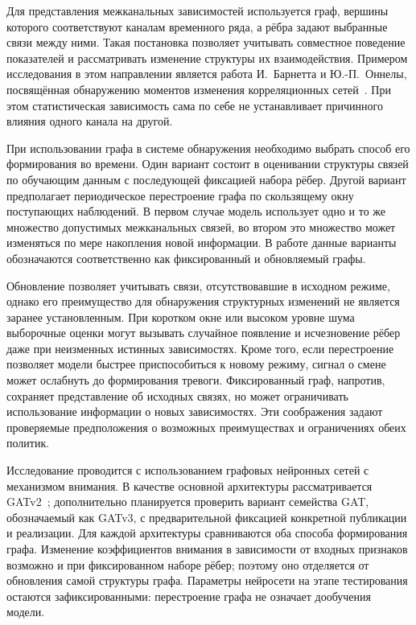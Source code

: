 \documentclass[bachelor, och, diploma]{SCWorks}
\begin{document}
Для представления межканальных зависимостей используется граф, вершины которого соответствуют каналам временного ряда, а рёбра задают выбранные связи между ними. Такая постановка позволяет учитывать совместное поведение показателей и рассматривать изменение структуры их взаимодействия. Примером исследования в этом направлении является работа И.~Барнетта и \mbox{Ю.-П.~Оннелы}, посвящённая обнаружению моментов изменения корреляционных сетей~\cite{barnett2016correlation}. При этом статистическая зависимость сама по себе не устанавливает причинного влияния одного канала на другой.

При использовании графа в системе обнаружения необходимо выбрать способ его формирования во времени. Один вариант состоит в оценивании структуры связей по обучающим данным с последующей фиксацией набора рёбер. Другой вариант предполагает периодическое перестроение графа по скользящему окну поступающих наблюдений. В первом случае модель использует одно и то же множество допустимых межканальных связей, во втором это множество может изменяться по мере накопления новой информации. В работе данные варианты обозначаются соответственно как фиксированный и обновляемый графы.

Обновление позволяет учитывать связи, отсутствовавшие в исходном режиме, однако его преимущество для обнаружения структурных изменений не является заранее установленным. При коротком окне или высоком уровне шума выборочные оценки могут вызывать случайное появление и исчезновение рёбер даже при неизменных истинных зависимостях. Кроме того, если перестроение позволяет модели быстрее приспособиться к новому режиму, сигнал о смене может ослабнуть до формирования тревоги. Фиксированный граф, напротив, сохраняет представление об исходных связях, но может ограничивать использование информации о новых зависимостях. Эти соображения задают проверяемые предположения о возможных преимуществах и ограничениях обеих политик.

Исследование проводится с использованием графовых нейронных сетей с механизмом внимания. В качестве основной архитектуры рассматривается GATv2~\cite{brody2022attentive}; дополнительно планируется проверить вариант семейства GAT, обозначаемый как GATv3, с предварительной фиксацией конкретной публикации и реализации. Для каждой архитектуры сравниваются оба способа формирования графа. Изменение коэффициентов внимания в зависимости от входных признаков возможно и при фиксированном наборе рёбер; поэтому оно отделяется от обновления самой структуры графа. Параметры нейросети на этапе тестирования остаются зафиксированными: перестроение графа не означает дообучения модели.
\end{document}
